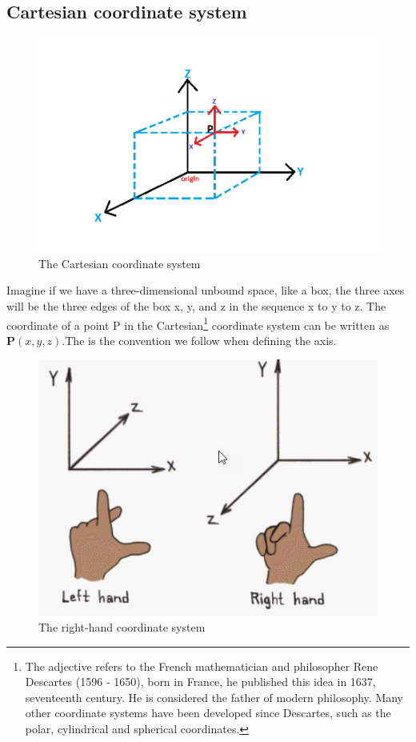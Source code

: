 \subsection{Cartesian coordinate system}
\begin{figure}[h]
\centering
\includegraphics[width=1\linewidth]{graphics/cartesian}
\caption{The Cartesian  coordinate system}
\end{figure}

Imagine if we have a three-dimensional unbound space, like a box, the three axes will be the three edges of the box x, y, and z in the sequence x to y to z. The coordinate of a point P in the {Cartesian}\footnote{The adjective \textacutedbl refers to the French mathematician and philosopher Rene Descartes (1596 - 1650), born in France, he published this idea in 1637, seventeenth century. He is considered the father of modern philosophy. Many other coordinate systems have been developed since Descartes, such as the polar, cylindrical and spherical coordinates.} coordinate system can be written as $\boldsymbol{P}(x, y, z)$.The  is the convention we follow when defining the axis.
\begin{figure}[h]
\centering
\includegraphics[width=1\linewidth]{graphics/coordinateHandSystem}
\caption{The right-hand coordinate system}
\end{figure}

